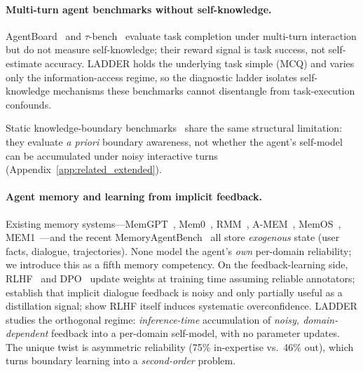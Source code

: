\documentclass[11pt]{article}
\begin{document}
\paragraph{Multi-turn agent benchmarks without self-knowledge.} AgentBoard~\citep{ma2024agentboard} and $\tau$-bench~\citep{yao2024taubench} evaluate task completion under multi-turn interaction but do not measure self-knowledge; their reward signal is task success, not self-estimate accuracy. LADDER holds the underlying task simple (MCQ) and varies only the information-access regime, so the diagnostic ladder isolates self-knowledge mechanisms these benchmarks cannot disentangle from task-execution confounds.

Static knowledge-boundary benchmarks~\citep{li2025knowledge_boundary, yin2024benchmarking_boundary, wei2024simpleqa, hendrycks2021measuring, lin2022truthfulqa, liang2022helm, geng2024survey} share the same structural limitation: they evaluate \emph{a priori} boundary awareness, not whether the agent's self-model can be accumulated under noisy interactive turns (Appendix~\ref{app:related_extended}).

\paragraph{Agent memory and learning from implicit feedback.} Existing memory systems---MemGPT~\citep{packer2023memgpt}, Mem0~\citep{mem02025}, RMM~\citep{tan2025rmm}, A-MEM~\citep{xu2025amem}, MemOS~\citep{li2025memos}, MEM1~\citep{mem1_2026}---and the recent MemoryAgentBench~\citep{hu2026memoryagent} all store \emph{exogenous} state (user facts, dialogue, trajectories). None model the agent's \emph{own} per-domain reliability; we introduce this as a fifth memory competency. On the feedback-learning side, RLHF~\citep{ouyang2022training} and DPO~\citep{rafailov2024direct} update weights at training time assuming reliable annotators; \citet{liu2025implicit} establish that implicit dialogue feedback is noisy and only partially useful as a distillation signal; \citet{leng2025taming} show RLHF itself induces systematic overconfidence. LADDER studies the orthogonal regime: \emph{inference-time} accumulation of \emph{noisy, domain-dependent} feedback into a per-domain self-model, with no parameter updates. The unique twist is asymmetric reliability (75\% in-expertise vs.\ 46\% out), which turns boundary learning into a \emph{second-order} problem.
\end{document}
